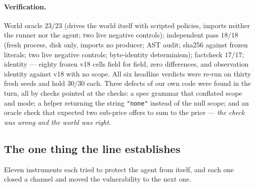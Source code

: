 \documentclass[11pt]{article}
\begin{document}
\paragraph{Verification.} World oracle $23/23$ (drives the world itself with scripted
policies, imports neither the runner nor the agent; two live negative controls);
independent pass $18/18$ (fresh process, disk only, imports no producer; AST audit;
sha256 against frozen literals; two live negative controls; byte-identity determinism);
factcheck $17/17$; identity --- eighty frozen v18 cells field for field, zero
differences, and observation identity against v18 with no scope. All six headline
verdicts were re-run on thirty fresh seeds and hold $30/30$ each. Three defects of our
own code were found in the turn, all by checks pointed at the checks: a spec grammar
that conflated scope and mode; a helper returning the string \texttt{"none"} instead
of the null scope; and an oracle check that expected two sub-price offers to sum to
the price --- \emph{the check was wrong and the world was right}.

\subsection{The one thing the line establishes}
\label{sec:arc}

Eleven instruments each tried to protect the agent from itself, and each one closed a
channel and moved the vulnerability to the next one.
\end{document}
